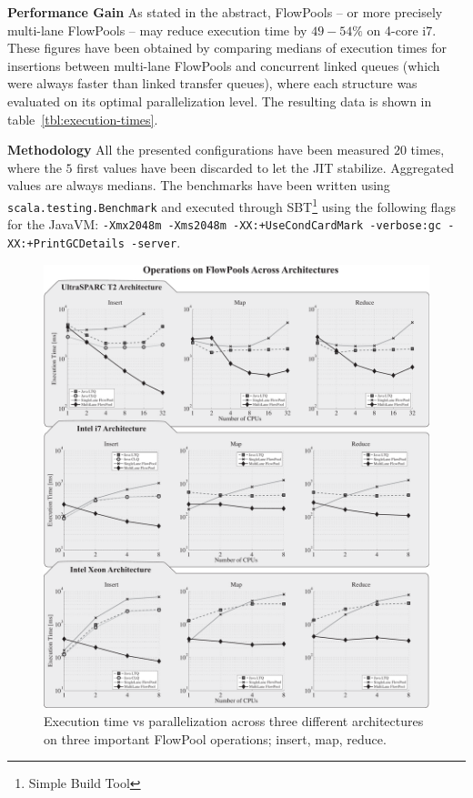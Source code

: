 \documentclass[runningheads,a4paper,fleqn]{llncs}
\begin{document}
\textbf{Performance Gain} As stated in the abstract, FlowPools -- or
more precisely multi-lane FlowPools -- may reduce execution time by
$49 - 54\%$ on 4-core i7. These figures have been obtained by
comparing medians of execution times for insertions between multi-lane
FlowPools and concurrent linked queues (which were always faster than 
linked transfer queues), where each structure was evaluated on its
optimal parallelization level. The resulting data is shown in
table~\ref{tbl:execution-times}.

\textbf{Methodology} All the presented configurations have been
measured $20$ times, where the $5$ first values have been discarded to
let the JIT stabilize. Aggregated values are always medians. The
benchmarks have been written using \verb=scala.testing.Benchmark= and
executed through SBT\footnote{Simple Build Tool} using the following
flags for the JavaVM: \texttt{-Xmx2048m -Xms2048m -XX:+UseCondCardMark
  -verbose:gc -XX:+PrintGCDetails -server}.

\begin{figure}
\centering
\includegraphics[width=\textwidth]{../../benchmarks/graphs/scaling-operations}
\caption{Execution time vs parallelization across three different
  architectures on three important FlowPool operations; insert, map,
  reduce.}
\label{fig:eval-cpu-scaling}
\end{figure}
\end{document}
